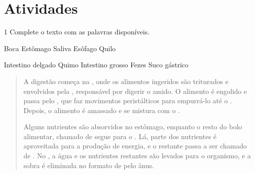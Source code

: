 
\pagebreak
\section*{Atividades}

\num{1} Complete o texto com as palavras disponíveis.

\begin{mdframed}[linewidth=2pt,linecolor=salmao,backgroundcolor=salmao!20]
Boca \hfill Estômago \hfill Saliva \hfill Esôfago \hfill Quilo \hfill

\noindent{}Intestino delgado \hfill Quimo \hfill Intestino grosso \hfill Fezes \hfill Suco gástrico \hfill
\end{mdframed}

\begin{quote}
A digestão começa na , onde os alimentos ingeridos são triturados e envolvidos pela , responsável por digerir o amido. O alimento é engolido e passa pelo , que faz movimentos peristálticos para empurrá-lo até o . Depois, o alimento é amassado e se mistura com o .

Alguns nutrientes são absorvidos no estômago, enquanto o resto do bolo alimentar, chamado de  segue para o . Lá, parte dos nutrientes é aproveitada para a produção de energia, e o restante passa a ser chamado de . No , a água e os nutrientes restantes são levados para o organismo, e a sobra é eliminada no formato de  pelo ânus.
\end{quote}


